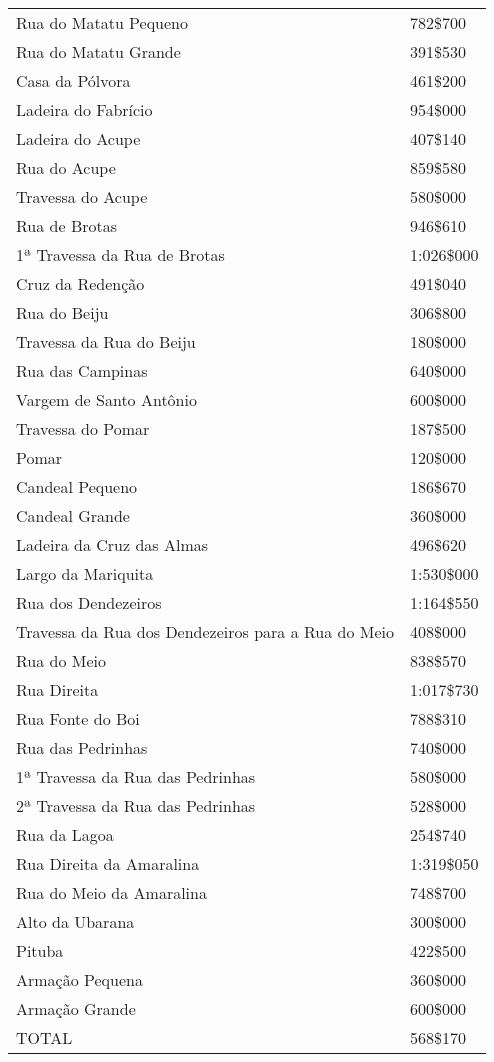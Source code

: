 \begin{table}[!htp]
{\begin{tiny}
\begin{tabular}{ll}
Rua do Matatu Pequeno	&782\$700\\
Rua do Matatu Grande	&391\$530\\
Casa da Pólvora	&461\$200\\
Ladeira do Fabrício	&954\$000\\
Ladeira do Acupe	&407\$140\\
Rua do Acupe	&859\$580\\
Travessa do Acupe	&580\$000\\
Rua de Brotas	&946\$610\\
1ª Travessa da Rua de Brotas	&1:026\$000\\
Cruz da Redenção	&491\$040\\
Rua do Beiju	&306\$800\\
Travessa da Rua do Beiju	&180\$000\\
Rua das Campinas	&640\$000\\
Vargem de Santo Antônio	&600\$000\\
Travessa do Pomar	&187\$500\\
Pomar	&120\$000\\
Candeal Pequeno	&186\$670\\
Candeal Grande	&360\$000\\
Ladeira da Cruz das Almas	&496\$620\\
Largo da Mariquita	&1:530\$000\\
Rua dos Dendezeiros	&1:164\$550\\
Travessa da Rua dos Dendezeiros para a Rua do Meio	&408\$000\\
Rua do Meio	&838\$570\\
Rua Direita	&1:017\$730\\
Rua Fonte do Boi	&788\$310\\
Rua das Pedrinhas	&740\$000\\
1ª Travessa da Rua das Pedrinhas	&580\$000\\
2ª Travessa da Rua das Pedrinhas	&528\$000\\
Rua da Lagoa	&254\$740\\
Rua Direita da Amaralina	&1:319\$050\\
Rua do Meio da Amaralina	&748\$700\\
Alto da Ubarana	&300\$000\\
Pituba	&422\$500\\
Armação Pequena	&360\$000\\
Armação Grande	&600\$000\\
\midrule
TOTAL	&568\$170\\
\bottomrule
\end{tabular} 
\end{tiny}
}
{}
\end{table}
